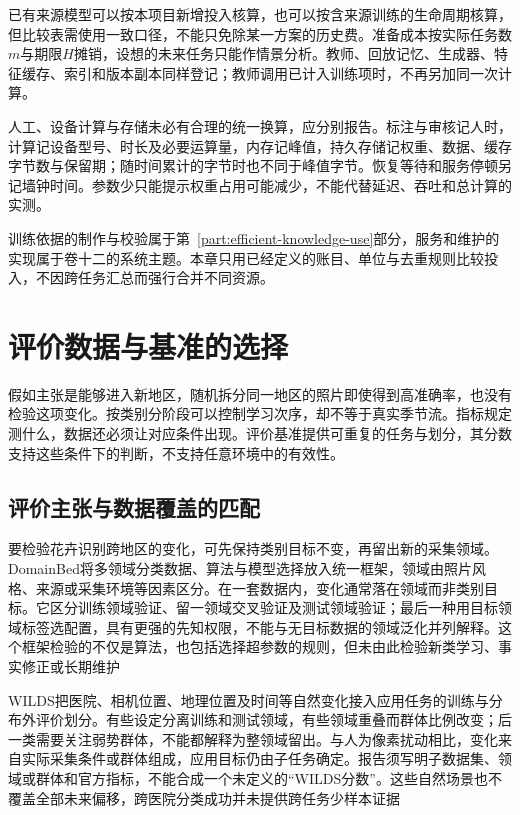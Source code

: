 已有来源模型可以按本项目新增投入核算，也可以按含来源训练的生命周期核算，但比较表需使用一致口径，不能只免除某一方案的历史费。准备成本按实际任务数$m$与期限$H$摊销，设想的未来任务只能作情景分析。教师、回放记忆、生成器、特征缓存、索引和版本副本同样登记；教师调用已计入训练项时，不再另加同一次计算。

人工、设备计算与存储未必有合理的统一换算，应分别报告。标注与审核记人时，计算记设备型号、时长及必要运算量，内存记峰值，持久存储记权重、数据、缓存字节数与保留期；随时间累计的字节时也不同于峰值字节。恢复等待和服务停顿另记墙钟时间。参数少只能提示权重占用可能减少，不能代替延迟、吞吐和总计算的实测。

训练依据的制作与校验属于第~\ref{part:efficient-knowledge-use}部分，服务和维护的实现属于卷十二的系统主题。本章只用已经定义的账目、单位与去重规则比较投入，不因跨任务汇总而强行合并不同资源。

\section{评价数据与基准的选择}
\label{sec:ket-evaluation-data}

假如主张是能够进入新地区，随机拆分同一地区的照片即使得到高准确率，也没有检验这项变化。按类别分阶段可以控制学习次序，却不等于真实季节流。指标规定测什么，数据还必须让对应条件出现。评价基准提供可重复的任务与划分，其分数支持这些条件下的判断，不支持任意环境中的有效性。

\subsection{评价主张与数据覆盖的匹配}
\label{sec:ket-evaluation-coverage}

要检验花卉识别跨地区的变化，可先保持类别目标不变，再留出新的采集领域。DomainBed将多领域分类数据、算法与模型选择放入统一框架，领域由照片风格、来源或采集环境等因素区分。在一套数据内，变化通常落在领域而非类别目标。它区分训练领域验证、留一领域交叉验证及测试领域验证；最后一种用目标领域标签选配置，具有更强的先知权限，不能与无目标数据的领域泛化并列解释。这个框架检验的不仅是算法，也包括选择超参数的规则，但未由此检验新类学习、事实修正或长期维护

WILDS把医院、相机位置、地理位置及时间等自然变化接入应用任务的训练与分布外评价划分。有些设定分离训练和测试领域，有些领域重叠而群体比例改变；后一类需要关注弱势群体，不能都解释为整领域留出。与人为像素扰动相比，变化来自实际采集条件或群体组成，应用目标仍由子任务确定。报告须写明子数据集、领域或群体和官方指标，不能合成一个未定义的“WILDS分数”。这些自然场景也不覆盖全部未来偏移，跨医院分类成功并未提供跨任务少样本证据

